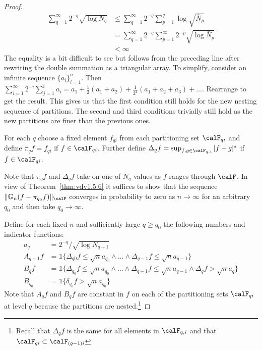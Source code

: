 \begin{proof}
{	\begin{align*}
		\sum_{q=1}^\infty 2^{-q} \sqrt{\log N_q} &\leq \sum_{q=1}^\infty 2^{-q} \sum_{p=1}^q \log \sqrt{\bar N_p} \\
												 &= \sum_{q=1}^\infty 2^{-q} \sum_{p=1}^\infty 2^{-p}\sqrt{\log \bar N_p}\\
												 &< \infty
	\end{align*}
	The equality is a bit difficult to see but follows from the preceding line after rewriting the double summation as a triangular array. To simplify, consider an infinite sequence \(\{a_i\}_{i=1}^n\). Then \(\sum_{i=1}^\infty 2^{-i} \sum_{j=1}^i a_i  = a_1 + \frac{1}{2}(a_1 + a_2) + \frac{1}{2^{2}}(a_1 + a_2 + a_3) + \dots\). Rearrange to get the result. This gives us that the first condition still holds for the new nesting sequence of partitions. The second and third conditions trivially still hold as the new partitions are finer than the previous ones.  
	}

	For each \(q\) choose a fixed element \(f_{qi}\) from each partitioning set \(\calF_{qi}\) and define \(\pi_qf = f_{qi}\) if \(f \in \calF_{qi}\). Further define \(\Delta_q f = \sup_{f,g\in\calF_{q,i}} |f-g|^\star\) if \(f\in\calF_{qi}\).

	Note that \(\pi_q f\) and \(\Delta_q f\) take on one of \(N_q\) values as \(f\) ranges through \(\calF\). In view of Theorem~\ref{thm:vdv1.5.6} it suffices to show that the sequence \(\|\mathbb{G}_n(f-\pi_{q_0}f)\|_\calF\) converges in probability to zero as \(n\to\infty\) for an arbitrary \(q_0\) and then take \(q_0 \to \infty\).

	Define for each fixed \(n\) and sufficiently large \(q \geq q_0\) the following numbers and indicator functions:
	\begin{align*}
		a_q &= 2^{-q}/\sqrt{\log N_{q+1}} \\
		A_{q-1}f &= \mathds{1}\{\Delta_{q0}f \leq \sqrt n a_{q_0} \wedge \dots\wedge \Delta_{q-1}f \leq \sqrt{n} a_{q-1}\}\\
		B_q f &= \mathds{1}\{\Delta_{q_0}f \leq \sqrt{n}a_{q_0}\wedge\dots\wedge \Delta_{q-1}f \leq \sqrt{n}a_{q-1}\wedge \Delta_q f > \sqrt{n} a_q \}\\
		B_{q_0} &= \mathds{1}\{\delta_{q_0}f > \sqrt{n}a_{q_0}\} 
	\end{align*}
	Note that \(A_qf\) and \(B_qf\) are constant in \(f\) on each of the partitioning sets \(\calF_{qi}\) at level \(q\) because the partitions are nested.\footnote{Recall that \(\Delta_q f\) is the same for all elements in \(\calF_{q,i}\) and that \(\calF_{qi} \subset \calF_{(q-1)i}\)}


\end{proof}
